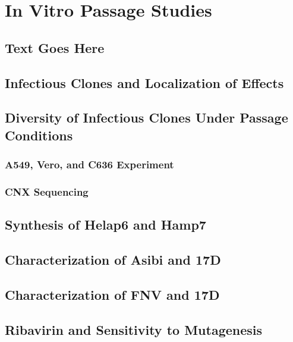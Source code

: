 \chapter{In Vitro Passage Studies}
\section{Text Goes Here}
\section{Infectious Clones and Localization of Effects}

\section{Diversity of Infectious Clones Under Passage Conditions}
\subsection{A549, Vero, and C636 Experiment}
\subsection{CNX Sequencing}

\section{Synthesis of Helap6 and Hamp7}

\section{Characterization of Asibi and 17D}

\section{Characterization of FNV and 17D}

\section{Ribavirin and Sensitivity to Mutagenesis}

